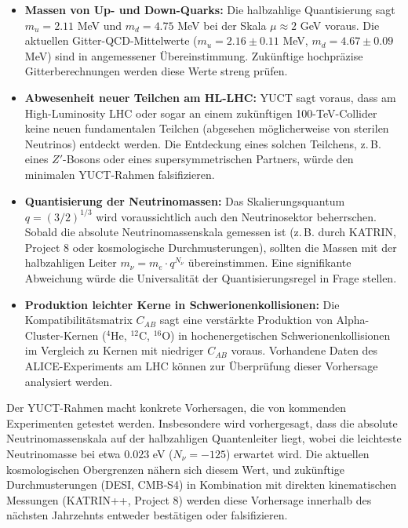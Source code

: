\documentclass[11pt,a4paper]{article}
\begin{document}
	\begin{itemize}
		\item \textbf{Massen von Up- und Down-Quarks:} Die halbzahlige Quantisierung sagt $m_u = 2.11$ MeV und $m_d = 4.75$ MeV bei der Skala $\mu \approx 2$ GeV voraus. Die aktuellen Gitter-QCD-Mittelwerte \cite{PDG2024} ($m_u = 2.16 \pm 0.11$ MeV, $m_d = 4.67 \pm 0.09$ MeV) sind in angemessener Übereinstimmung. Zukünftige hochpräzise Gitterberechnungen werden diese Werte streng prüfen.
		
		\item \textbf{Abwesenheit neuer Teilchen am HL-LHC:} YUCT sagt voraus, dass am High-Luminosity LHC oder sogar an einem zukünftigen 100-TeV-Collider keine neuen fundamentalen Teilchen (abgesehen möglicherweise von sterilen Neutrinos) entdeckt werden. Die Entdeckung eines solchen Teilchens, z. B. eines $Z'$-Bosons oder eines supersymmetrischen Partners, würde den minimalen YUCT-Rahmen falsifizieren.
		
		\item \textbf{Quantisierung der Neutrinomassen:} Das Skalierungsquantum $q = (3/2)^{1/3}$ wird voraussichtlich auch den Neutrinosektor beherrschen. Sobald die absolute Neutrinomassenskala gemessen ist (z. B. durch KATRIN, Project 8 oder kosmologische Durchmusterungen), sollten die Massen mit der halbzahligen Leiter $m_\nu = m_e \cdot q^{N_\nu}$ übereinstimmen. Eine signifikante Abweichung würde die Universalität der Quantisierungsregel in Frage stellen.
		
		\item \textbf{Produktion leichter Kerne in Schwerionenkollisionen:} Die Kompatibilitätsmatrix $C_{AB}$ sagt eine verstärkte Produktion von Alpha-Cluster-Kernen ($^4$He, $^{12}$C, $^{16}$O) in hochenergetischen Schwerionenkollisionen im Vergleich zu Kernen mit niedriger $C_{AB}$ voraus. Vorhandene Daten des ALICE-Experiments am LHC können zur Überprüfung dieser Vorhersage analysiert werden.
	\end{itemize}
	
	Der YUCT-Rahmen macht konkrete Vorhersagen, die von kommenden Experimenten getestet werden. Insbesondere wird vorhergesagt, dass die absolute Neutrinomassenskala auf der halbzahligen Quantenleiter liegt, wobei die leichteste Neutrinomasse bei etwa $0.023$ eV ($N_\nu = -125$) erwartet wird. Die aktuellen kosmologischen Obergrenzen nähern sich diesem Wert, und zukünftige Durchmusterungen (DESI, CMB‑S4) in Kombination mit direkten kinematischen Messungen (KATRIN++, Project 8) werden diese Vorhersage innerhalb des nächsten Jahrzehnts entweder bestätigen oder falsifizieren.
	
\end{document}
